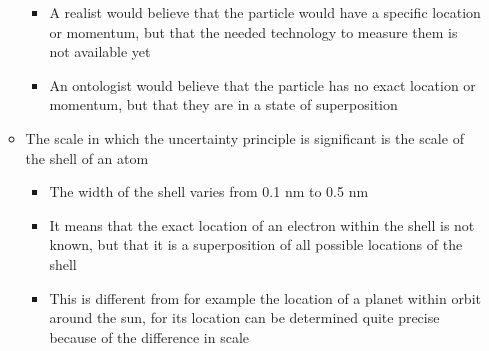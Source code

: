 \documentclass[11pt,twoside]{report} %
\begin{document}
\begin{itemize}
\begin{itemize}
\begin{itemize}
			\item A realist would believe that the particle would have a specific location or momentum, but that the needed technology to measure them is not available yet
			\item An ontologist would believe that the particle has no exact location or momentum, but that they are in a state of superposition
		\end{itemize}
		\item The scale in which the uncertainty principle is significant is the scale of the shell of an atom
		\begin{itemize}
			\item The width of the shell varies from 0.1 nm to 0.5 nm
			\item It means that the exact location of an electron within the shell is not known, but that it is a superposition of all possible locations of the shell
			\item This is different from for example the location of a planet within orbit around the sun, for its location can be determined quite precise because of the difference in scale
		\end{itemize}
	\end{itemize}
\end{itemize}
\end{document}
